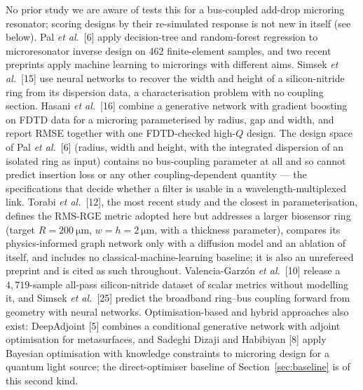 \documentclass[11pt]{article}
\newcommand{\rge}{\mathrm{RMS\text{-}RGE}}
\begin{document}
No prior study we are aware of tests this for a bus-coupled add-drop microring resonator; scoring designs by their re-simulated response is not new in itself (see below). Pal \emph{et al.}\ [6] apply decision-tree and random-forest regression to microresonator inverse design on 462 finite-element samples, and two recent preprints apply machine learning to microrings with different aims. Simsek \emph{et al.}\ [15] use neural networks to recover the width and height of a silicon-nitride ring from its dispersion data, a characterisation problem with no coupling section. Hasani \emph{et al.}\ [16] combine a generative network with gradient boosting on FDTD data for a microring parameterised by radius, gap and width, and report RMSE together with one FDTD-checked high-$Q$ design. The design space of Pal \emph{et al.}\ [6] (radius, width and height, with the integrated dispersion of an isolated ring as input) contains no bus-coupling parameter at all and so cannot predict insertion loss or any
other coupling-dependent quantity --- the specifications that decide whether a
filter is usable in a wavelength-multiplexed link. Torabi \emph{et al.}\
[12], the most recent study and the closest in parameterisation, defines the $\rge$ metric adopted here but addresses a larger biosensor ring (target $R = \SI{200}{\micro\metre}$, $w = h = \SI{2}{\micro\metre}$, with a thickness parameter), compares its physics-informed graph network only with a diffusion model and an ablation of itself, and includes no classical-machine-learning baseline; it is also an unrefereed
preprint and is cited as such throughout. Valencia-Garz\'on \emph{et al.}\
[10] release a $4{,}719$-sample all-pass silicon-nitride dataset of scalar metrics without modelling it, and Simsek \emph{et al.}\ [25] predict the broadband ring--bus coupling forward from geometry with neural networks. Optimisation-based and hybrid approaches also exist: DeepAdjoint [5] combines a conditional generative network with adjoint optimisation for metasurfaces, and Sadeghi Dizaji and Habibiyan [8] apply Bayesian optimisation with knowledge constraints to microring design for a quantum light source; the direct-optimiser baseline of Section~\ref{sec:baseline} is of this second kind.
\end{document}
